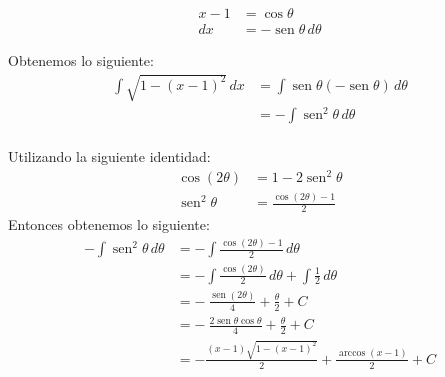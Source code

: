 \documentclass[a4paper,10pt]{article}
\newcommand{\dis}{\displaystyle}
\def\sin{\operatorname{sen}}
\begin{document}
\begin{enumerate}
\begin{enumerate}[label=\emph{\alph*)}]
\begin{minipage}{.3\textwidth}
\raggedright
\begin{align*}
x -1  &= \cos \theta      \\
dx &= -\sin \theta  \, d\theta
\end{align*}
\end{minipage}%
\begin{minipage}{.3\textwidth}
\raggedleft
{}
\end{minipage}

Obtenemos lo siguiente:
\begin{align*}
 \dis \int \sqrt{1 - (x-1)^2}\, dx  &=    \dis \int \sin \theta (-\sin \theta)  \, d\theta\\
 									&=	 -\dis \int \sin^2 \theta  \, d\theta\\
\end{align*}
\dotfill [1 punto]

Utilizando la siguiente identidad:
\begin{align*}
 \dis \cos (2\theta)  &=    1 - 2\sin^2 \theta \\
 \dis \sin^2 \theta  &=    \frac{\cos (2\theta)-1}{2}
\end{align*}
Entonces obtenemos lo siguiente:
\begin{align*}
 -\dis \int \sin^2 \theta  \, d\theta  &=    -\dis \int \frac{\cos (2\theta)-1}{2}  \, d\theta \\
 									   &=	 -\dis \int \frac{\cos (2\theta)}{2}  \, d\theta + \int \frac{1}{2} \, d\theta\\
                                       &=	 -\dis \ \frac{\sin (2\theta)}{4}  +  \frac{\theta}{2} + C\\
                                       &=	 -\dis \ \frac{2\sin \theta \cos \theta}{4}  +  \frac{\theta}{2} + C\\
                                       &=    \dis - \frac{(x-1)\sqrt{1-(x-1)^2}}{2} + \frac{\arccos (x-1) }{2}   + C
\end{align*}


\end{enumerate}
\end{enumerate}
\end{document}
